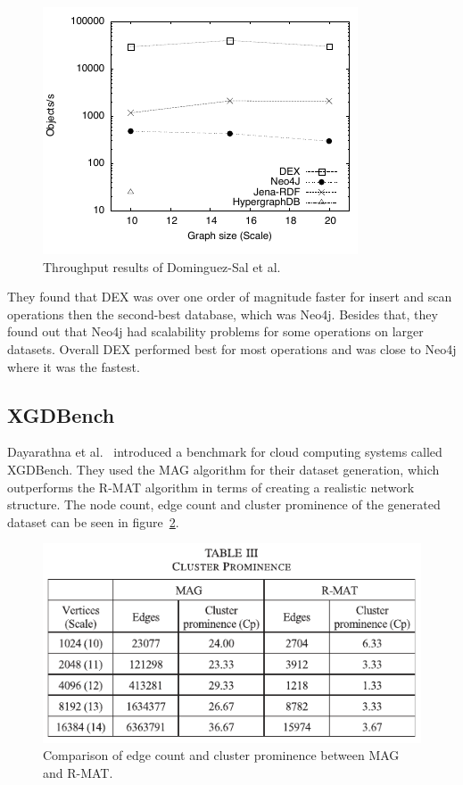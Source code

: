 \begin{figure}[h!]
  \centering
  \includegraphics[width=.75\textwidth]{images/benchmarks/ShenResultsInsert}
  \caption{Throughput results of Dominguez-Sal et al.~\cite{TaoShen}}
  \label{fig:throughputDominguez}
\end{figure}

They found that DEX was over one order of magnitude faster for insert and scan operations then the second-best database,
which was Neo4j.
Besides that,
they found out that Neo4j had scalability problems for some operations on larger datasets.
Overall DEX performed best for most operations and was close to Neo4j where it was the fastest.

\subsection{XGDBench}
Dayarathna et al.~\cite{Dayarathna2012} introduced a benchmark for cloud computing systems called XGDBench.
They used the MAG algorithm for their dataset generation,
which outperforms the R-MAT algorithm in terms of creating a realistic network structure.
The node count, edge count and cluster prominence of the generated dataset can be seen in figure~\ref{fig:XGDBenchDataset}.

\begin{figure}[h!]
  \centering
  \includegraphics[width=.75\textwidth]{images/benchmarks/XGDBenchDataset}
  \caption{Comparison of edge count and cluster prominence between MAG and R-MAT.~\cite{Dayarathna2012}}
  \label{fig:XGDBenchDataset}
\end{figure}

